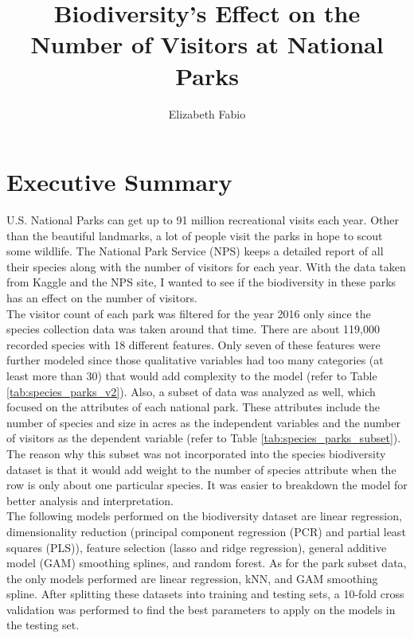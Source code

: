 \documentclass[stu, floatsintext, 11pt]{apa7}
\title{Biodiversity's Effect on the Number of Visitors at National Parks}
\author{Elizabeth Fabio}
\affiliation{Department of Management Information Systems, San Diego State University}
\begin{document}
\maketitle

\section{Executive Summary}
U.S. National Parks can get up to 91 million recreational visits each year. Other than the beautiful landmarks, a lot of people visit the parks in hope to scout some wildlife. The National Park Service (NPS) keeps a detailed report of all their species along with the number of visitors for each year. With the data taken from Kaggle and the NPS site, I wanted to see if the biodiversity in these parks has an effect on the number of visitors. \\

The visitor count of each park was filtered for the year 2016 only since the species collection data was taken around that time. There are about 119,000 recorded species with 18 different features. Only seven of these features were further modeled since those qualitative variables had too many categories (at least more than 30) that would add complexity to the model (refer to Table \ref{tab:species_parks_v2}). Also, a subset of data was analyzed as well, which focused on the attributes of each national park. These attributes include the number of species and size in acres as the independent variables and the number of visitors as the dependent variable (refer to Table \ref{tab:species_parks_subset}). The reason why this subset was not incorporated into the species biodiversity dataset is that it would add weight to the number of species attribute when the row is only about one particular species. It was easier to breakdown the model for better analysis and interpretation. \\

The following models performed on the biodiversity dataset are linear regression, dimensionality reduction (principal component regression (PCR) and partial least squares (PLS)), feature selection (lasso and ridge regression), general additive model (GAM) smoothing splines, and random forest. As for the park subset data, the only models performed are linear regression, kNN, and GAM smoothing spline. After splitting these datasets into training and testing sets, a 10-fold cross validation was performed to find the best parameters to apply on the models in the testing set. \\
\end{document}
